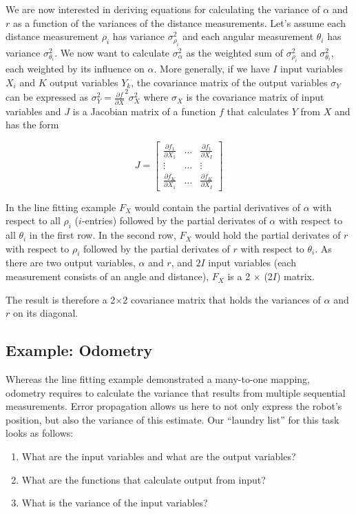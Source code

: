 We are now interested in deriving equations for calculating the variance of $ \alpha$ and $ r$ as a function of the variances of the distance measurements. Let's assume each distance measurement $ \rho_i$ has variance $ \sigma^2_{\rho_i}$ and each angular measurement $ \theta_i$ has variance $ \sigma^2_{\theta_i}$. We now want to calculate $ \sigma^2_{\alpha}$ as the weighted sum of  $ \sigma^2_{\rho_i}$ and $ \sigma^2_{\theta_i}$, each weighted by its influence on $ \alpha$.
More generally, if we have $ I$ input variables $ X_i$ and $K$ output variables $Y_k$, the covariance matrix of the output variables $ \sigma_Y$ can be expressed as $\sigma_Y^2=\frac{\partial f}{\partial X}^2 \sigma_X^2$ where $\sigma_X$ is the covariance matrix of input variables and $J$ is a Jacobian matrix of a function $ f$ that calculates $Y$ from $X$ and has the form

\begin{equation}
J=\left[
\begin{array}{ccc}
  \frac{\partial f_1}{\partial X_1} & \ldots & \frac{\partial f_1}{\partial X_I}\\
  \vdots & \ldots & \vdots\\
  \frac{\partial f_K}{\partial X_1} & \ldots & \frac{\partial f_K}{\partial X_I}
 \end{array}
 \right]
\end{equation}

In the line fitting example $ F_X$ would contain the partial derivatives of $ \alpha$ with respect to all $ \rho_i$ ($i$-entries) followed by the partial derivates of $ \alpha$ with respect to all $ \theta_i$ in the first row. In the second row, $ F_X$ would hold the partial derivates of $ r$ with respect to $ \rho_i$ followed by the partial derivates of $ r$ with respect to $ \theta_i$. As there are two output variables, $ \alpha$ and $ r$, and $2I$ input variables (each measurement consists of an angle and distance), $ F_X$ is a 2 $\times$ (2$I$) matrix.

The result is therefore a 2$\times$2 covariance matrix that holds the variances of $ \alpha$ and $ r$ on its diagonal.

\subsection{Example: Odometry}
Whereas the line fitting example demonstrated a many-to-one mapping, odometry requires to calculate the variance that results from multiple sequential measurements.  Error propagation allows us here to not only express the robot's position, but also the variance of this estimate. Our ``laundry list'' for this task looks as follows:
\begin{enumerate}
\item What are the input variables and what are the output variables?
\item What are the functions that calculate output from input?
\item What is the variance of the input variables?
\end{enumerate}

